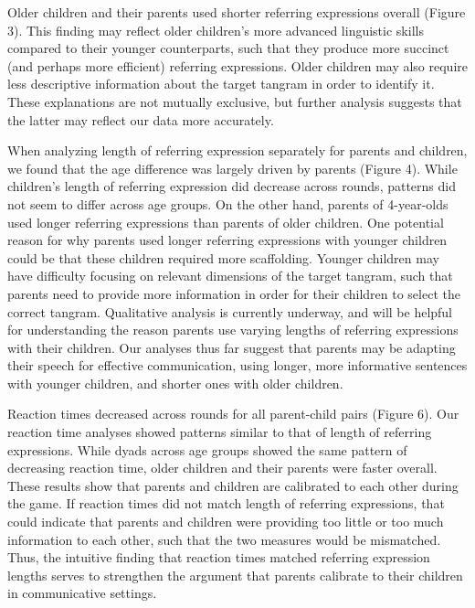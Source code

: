 \documentclass[10pt, letterpaper]{article}
\begin{document}
Older children and their parents used shorter referring expressions
overall (Figure 3). This finding may reflect older children's more
advanced linguistic skills compared to their younger counterparts, such
that they produce more succinct (and perhaps more efficient) referring
expressions. Older children may also require less descriptive
information about the target tangram in order to identify it. These
explanations are not mutually exclusive, but further analysis suggests
that the latter may reflect our data more accurately.

When analyzing length of referring expression separately for parents and
children, we found that the age difference was largely driven by parents
(Figure 4). While children's length of referring expression did decrease
across rounds, patterns did not seem to differ across age groups. On the
other hand, parents of 4-year-olds used longer referring expressions
than parents of older children. One potential reason for why parents
used longer referring expressions with younger children could be that
these children required more scaffolding. Younger children may have
difficulty focusing on relevant dimensions of the target tangram, such
that parents need to provide more information in order for their
children to select the correct tangram. Qualitative analysis is
currently underway, and will be helpful for understanding the reason
parents use varying lengths of referring expressions with their
children. Our analyses thus far suggest that parents may be adapting
their speech for effective communication, using longer, more informative
sentences with younger children, and shorter ones with older children.

Reaction times decreased across rounds for all parent-child pairs
(Figure 6). Our reaction time analyses showed patterns similar to that
of length of referring expressions. While dyads across age groups showed
the same pattern of decreasing reaction time, older children and their
parents were faster overall. These results show that parents and
children are calibrated to each other during the game. If reaction times
did not match length of referring expressions, that could indicate that
parents and children were providing too little or too much information
to each other, such that the two measures would be mismatched. Thus, the
intuitive finding that reaction times matched referring expression
lengths serves to strengthen the argument that parents calibrate to
their children in communicative settings.
\end{document}
